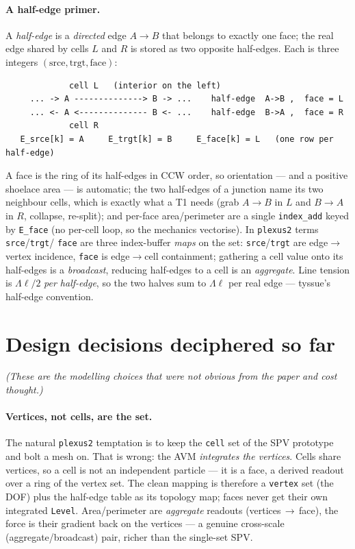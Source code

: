 \documentclass[11pt]{article}
\begin{document}
\paragraph{A half-edge primer.}
A \emph{half-edge} is a \emph{directed} edge $A\!\to\!B$ that belongs to exactly one face; the
real edge shared by cells $L$ and $R$ is stored as two opposite half-edges. Each is three
integers $(\mathrm{srce},\mathrm{trgt},\mathrm{face})$:
\begin{center}\small
\begin{verbatim}
             cell L   (interior on the left)
     ... -> A --------------> B -> ...    half-edge  A->B ,  face = L
     ... <- A <-------------- B <- ...    half-edge  B->A ,  face = R
             cell R
   E_srce[k] = A     E_trgt[k] = B     E_face[k] = L   (one row per half-edge)
\end{verbatim}
\end{center}
A face is the ring of its half-edges in CCW order, so orientation --- and a positive shoelace
area --- is automatic; the two half-edges of a junction name its two neighbour cells, which is
exactly what a T1 needs (grab $A\!\to\!B$ in $L$ and $B\!\to\!A$ in $R$, collapse, re-split); and
per-face area/perimeter are a single \texttt{index\_add} keyed by \texttt{E\_face} (no per-cell
loop, so the mechanics vectorise). In \texttt{plexus2} terms \texttt{srce}/\texttt{trgt}/%
\texttt{face} are three index-buffer \emph{maps} on the set: \texttt{srce}/\texttt{trgt} are
edge$\to$vertex incidence, \texttt{face} is edge$\to$cell containment; gathering a cell value onto
its half-edges is a \emph{broadcast}, reducing half-edges to a cell is an \emph{aggregate}. Line
tension is $\Lambda\ell/2$ \emph{per half-edge}, so the two halves sum to $\Lambda\ell$ per real
edge --- tyssue's half-edge convention.

\section{Design decisions deciphered so far}
\emph{(These are the modelling choices that were not obvious from the paper and cost thought.)}

\paragraph{Vertices, not cells, are the set.}
The natural \texttt{plexus2} temptation is to keep the \texttt{cell} set of the SPV prototype and
bolt a mesh on. That is wrong: the AVM \emph{integrates the vertices}. Cells share vertices, so a
cell is not an independent particle --- it is a face, a derived readout over a ring of the vertex
set. The clean mapping is therefore a \texttt{vertex} set (the DOF) plus the half-edge table as
its topology map; faces never get their own integrated \texttt{Level}. Area/perimeter are
\emph{aggregate} readouts (vertices\,$\to$\,face), the force is their gradient back on the
vertices --- a genuine cross-scale (aggregate/broadcast) pair, richer than the single-set SPV.
\end{document}
